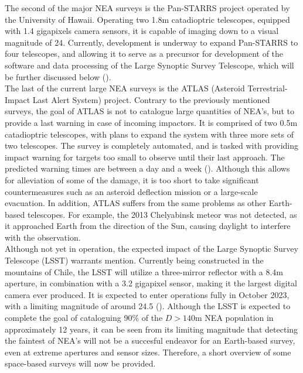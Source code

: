 The second of the major NEA surveys is the Pan-STARRS project operated by the University of Hawaii. Operating two 1.8m catadioptric telescopes, equipped with 1.4 gigapixels camera sensors, it is capable of imaging down to a visual magnitude of 24. Currently, development is underway to expand Pan-STARRS to four telescopes, and allowing it to serve as a precursor for development of the software and data processing of the Large Synoptic Survey Telescope, which will be further discussed below (\cite{PANSTARRS}).\\

The last of the current large NEA surveys is the ATLAS (Asteroid Terrestrial-Impact Last Alert System) project. Contrary to the previously mentioned surveys, the goal of ATLAS is not to catalogue large quantities of NEA's, but to provide a last warning in case of incoming impactors. It is comprised of two 0.5m catadioptric telescopes, with plans to expand the system with three more sets of two telescopes. The survey is completely automated, and is tasked with providing impact warning for targets too small to observe until their last approach. The predicted warning times are between a day and a week (\cite{ATLAS}). Although this allows for alleviation of some of the damage, it is too short to take significant countermeasures such as an asteroid deflection mission or a large-scale evacuation. In addition, ATLAS suffers from the same problems as other Earth-based telescopes. For example, the 2013 Chelyabinsk meteor was not detected, as it approached Earth from the direction of the Sun, causing daylight to interfere with the observation.\\

Although not yet in operation, the expected impact of the Large Synoptic Survey Telescope (LSST) warrants mention. Currently being constructed in the mountains of Chile, the LSST will utilize a three-mirror reflector with a 8.4m aperture, in combination with a 3.2 gigapixel sensor, making it the largest digital camera ever produced. It is expected to enter operations fully in October 2023, with a limiting magnitude of around 24.5 (\cite{LSST}). Although the LSST is expected to complete the goal of cataloguing 90\% of the $D > 140 \mathrm{m}$ NEA population in approximately 12 years, it can be seen from its limiting magnitude that detecting the faintest of NEA's will not be a succesful endeavor for an Earth-based survey, even at extreme apertures and sensor sizes. Therefore, a short overview of some space-based surveys will now be provided.\\

